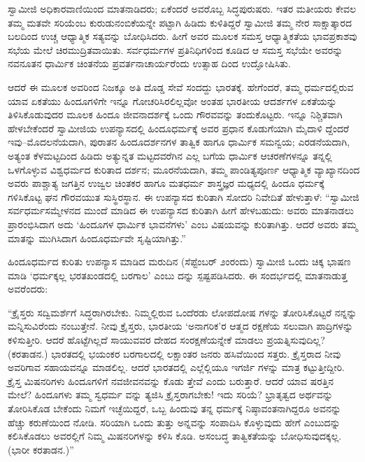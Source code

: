 ಸ್ವಾಮೀಜಿ ಅಧಿಕಾರವಾಣಿಯಿಂದ ಮಾತನಾಡಿದರು; ಏಕೆಂದರೆ ಅವರೊಬ್ಬ ಸಿದ್ಧಪುರುಷರು. ಇತರ ಮತೀಯರು ಕೇವಲ ತಮ್ಮ ಮತವೇ ಸರಿಯೆಂಬ ಕುರುಡುನಂಬಿಕೆಯನ್ನೇ ಪಟ್ಟಾಗಿ ಹಿಡಿದು ಕುಳಿತಿದ್ದರೆ ಸ್ವಾಮೀಜಿ ತಮ್ಮ ನೇರ ಸಾಕ್ಷಾತ್ಕಾರದ ಬಲದಿಂದ ಉಚ್ಚ ಆಧ್ಯಾತ್ಮಿಕ ಸತ್ಯವನ್ನು ಬೋಧಿಸಿದರು. ಹೀಗೆ ಅವರ ಮೂಲಕ ಸಮಸ್ತ ಆಧ್ಯಾತ್ಮಿಕತೆಯ ಭಾವಪ್ರಕಾಶವು ಸಭೆಯ ಮೇಲೆ ಚಿರಮುದ್ರಿತವಾಯಿತು. ಸರ್ವಧರ್ಮಗಳ ಪ್ರತಿನಿಧಿಗಳಿಂದ ಕೂಡಿದ ಆ ಸಮಸ್ತ ಸಭೆಯೇ ಅವರನ್ನು ನವನೂತನ ಧಾರ್ಮಿಕ ಚಿಂತನೆಯ ಪ್ರವರ್ತನಾಚಾರ್ಯರೆಂದು ಉತ್ಸಾಹ ದಿಂದ ಉದ್ಘೋಷಿಸಿತು.

ಆದರೆ ಈ ಮೂಲಕ ಅವರಿಂದ ನಿಜಕ್ಕೂ ಅತಿ ದೊಡ್ಡ ಸೇವೆ ಸಂದದ್ದು ಭಾರತಕ್ಕೆ. ಹೇಗೆಂದರೆ, ತಮ್ಮ ಧರ್ಮದಲ್ಲಿರುವ ಯಾವ ಏಕತೆಯು ಹಿಂದೂಗಳಿಗೇ ಇನ್ನೂ ಗೋಚರಿಸಿರಲಿಲ್ಲವೋ ಅಂತಹ ಭಾರತೀಯ ಆದರ್ಶಗಳ ಏಕತೆಯನ್ನು ತಿಳಿಸಿಕೊಡುವುದರ ಮೂಲಕ ಹಿಂದೂ ಜೀವನಾದರ್ಶಕ್ಕೆ ಒಂದು ಗೌರವವನ್ನು ತಂದುಕೊಟ್ಟರು. ಇನ್ನೂ ನಿಶ್ಚಿತವಾಗಿ ಹೇಳಬೇಕೆಂದರೆ ಸ್ವಾಮೀಜಿಯ ಉಪನ್ಯಾಸದಲ್ಲಿ ಹಿಂದೂಧರ್ಮಕ್ಕೆ ಅವರ ಪ್ರಧಾನ ಕೊಡುಗೆಯಾಗಿ ಮೈದಾಳಿ ದ್ದೆಂದರೆ ಇವು–ಮೊದಲನೆಯದಾಗಿ, ಪುರಾತನ ಹಿಂದೂದರ್ಶನಗಳ ತಾತ್ವಿಕ ಹಾಗೂ ಧಾರ್ಮಿಕ ಸಮನ್ವಯ; ಎರಡನೆಯದಾಗಿ, ಅತ್ಯಂತ ಕೆಳಮಟ್ಟದಿಂದ ಹಿಡಿದು ಅತ್ಯುನ್ನತ ಮಟ್ಟದವರೆಗಿನ ಎಲ್ಲ ಬಗೆಯ ಧಾರ್ಮಿಕ ಆಚರಣೆಗಳನ್ನೂ ತನ್ನಲ್ಲಿ ಒಳಗೊಳ್ಳುವ ವಿಶ್ವಧರ್ಮದ ಕುರಿತಾದ ದರ್ಶನ; ಮೂರನೆಯದಾಗಿ, ತಮ್ಮ ಪಾಂಡಿತ್ಯಪೂರ್ಣ ಆಧ್ಯಾತ್ಮಿಕ ವ್ಯಾಖ್ಯಾನದಿಂದ ಅವರು ಪಾಶ್ಚಾತ್ಯ ಜಗತ್ತಿನ ಉಜ್ವಲ ಚಿಂತಕರ ಹಾಗೂ ಮತಧರ್ಮ ಶಾಸ್ತ್ರಜ್ಞರ ಮಧ್ಯದಲ್ಲಿ ಹಿಂದೂ ಧರ್ಮಕ್ಕೆ ಗಳಿಸಿಕೊಟ್ಟ ಘನ ಗೌರವಯುತ ಸುಸ್ಥಿರಸ್ಥಾನ. ಈ ಉಪನ್ಯಾಸದ ಕುರಿತಾಗಿ ಸೋದರಿ ನಿವೇದಿತೆ ಹೇಳುತ್ತಾಳೆ: “ಸ್ವಾಮೀಜಿ ಸರ್ವಧರ್ಮಸಮ್ಮೇಳನದ ಮುಂದೆ ಮಾಡಿದ ಈ ಉಪನ್ಯಾಸದ ಕುರಿತಾಗಿ ಹೀಗೆ ಹೇಳಬಹುದು: ಅವರು ಮಾತನಾಡಲು ಪ್ರಾರಂಭಿಸಿದಾಗ ಅದು ‘ಹಿಂದೂಗಳ ಧಾರ್ಮಿಕ ಭಾವನೆಗಳು’ ಎಂಬ ವಿಷಯವನ್ನು ಕುರಿತಾಗಿತ್ತು. ಆದರೆ ಅವರು ತಮ್ಮ ಮಾತನ್ನು ಮುಗಿಸಿದಾಗ ಹಿಂದೂಧರ್ಮವೇ ಸೃಷ್ಟಿಯಾಗಿತ್ತು.”

ಹಿಂದೂಧರ್ಮದ ಕುರಿತು ಉಪನ್ಯಾಸ ಮಾಡಿದ ಮರುದಿನ (ಸೆಪ್ಟೆಂಬರ್ ೨ಂರಂದು) ಸ್ವಾಮೀಜಿ ಒಂದು ಚಿಕ್ಕ ಭಾಷಣ ಮಾಡಿ ‘ಧರ್ಮಕ್ಕಲ್ಲ ಭರತಖಂಡದಲ್ಲಿ ಬರಗಾಲ’ ಎಂಬು ದನ್ನು ಸ್ಪಷ್ಟಪಡಿಸಿದರು. ಈ ಸಂದರ್ಭದಲ್ಲಿ ಮಾತನಾಡುತ್ತ ಅವರೆಂದರು:

“ಕ್ರೈಸ್ತರು ಸದ್ವಿಮರ್ಶೆಗೆ ಸಿದ್ಧರಾಗಿರಬೇಕು. ನಿಮ್ಮಲ್ಲಿರುವ ಒಂದೆರಡು ಲೋಪದೋಷ ಗಳನ್ನು ತೋರಿಸಿಕೊಟ್ಟರೆ ನನ್ನನ್ನು ಮನ್ನಿಸುವಿರೆಂದು ನಂಬುತ್ತೇನೆ. ನೀವು ಕ್ರೈಸ್ತರು, ಭಾರತೀಯ ‘ಅನಾಗರಿಕ’ರ ಆತ್ಮದ ರಕ್ಷಣೆಯ ಸಲುವಾಗಿ ಪಾದ್ರಿಗಳನ್ನು ಕಳಿಸುತ್ತೀರಿ. ಆದರೆ ಹೊಟ್ಟೆಗಿಲ್ಲದೆ ಸಾಯುವವರ ದೇಹದ ಸಂರಕ್ಷಣೆಯನ್ನೇಕೆ ಮಾಡಲು ಪ್ರಯತ್ನಿಸುವುದಿಲ್ಲ? (ಕರತಾಡನ.) ಭಾರತದಲ್ಲಿ ಭಯಂಕರ ಬರಗಾಲದಲ್ಲಿ ಲಕ್ಷಾಂತರ ಜನರು ಹಸಿವೆಯಿಂದ ಸತ್ತರು. ಕ್ರೈಸ್ತರಾದ ನೀವು ಅವರಿಗಾವ ಸಹಾಯವನ್ನೂ ಮಾಡಲಿಲ್ಲ. ಆದರೆ ಭಾರತದಲ್ಲಿ ಎಲ್ಲೆಲ್ಲಿಯೂ ಇಗರ್ಜಿ ಗಳನ್ನು ಮಾತ್ರ ಕಟ್ಟುತ್ತೀದ್ದೀರಿ. ಕ್ರೈಸ್ತ ಮಿಷನರಿಗಳು ಹಿಂದೂಗಳಿಗೆ ನವಜೀವನವನ್ನು ಕೊಡು ತ್ತೇವೆ ಎಂದು ಬರುತ್ತಾರೆ. ಆದರೆ ಯಾವ ಷರತ್ತಿನ ಮೇಲೆ? ಹಿಂದೂಗಳು ತಮ್ಮ ಸ್ವಧರ್ಮ ವನ್ನು ತ್ಯಜಿಸಿ ಕ್ರೈಸ್ತರಾಗಬೇಕು! ಇದು ಸರಿಯೆ? ಭ್ರಾತೃತ್ವದ ಅರ್ಥವನ್ನು ತೋರಿಸಿಕೊಡ ಬೇಕೆಂದು ನಿಮಗೆ ಇಚ್ಛೆಯಿದ್ದರೆ, ಒಬ್ಬ ಹಿಂದುವು ತನ್ನ ಧರ್ಮಕ್ಕೆ ನಿಷ್ಠಾವಂತನಾಗಿದ್ದರೂ ಅವನನ್ನು ಹೆಚ್ಚು ಕರುಣೆಯಿಂದ ನೋಡಿ. ಸರಿಯಾಗಿ ಒಂದು ತುತ್ತು ಅನ್ನವನ್ನು ಸಂಪಾದಿಸಿ ಕೊಳ್ಳುವುದು ಹೇಗೆ ಎಂಬುದನ್ನು ಕಲಿಸಿಕೊಡಲು ಅವರಲ್ಲಿಗೆ ನಿಮ್ಮ ಮಿಷನರಿಗಳನ್ನು ಕಳಿಸಿ ಕೊಡಿ. ಅಸಂಬದ್ಧ ತಾತ್ವಿಕತೆಯನ್ನು ಬೋಧಿಸುವುದಕ್ಕಲ್ಲ. (ಭಾರೀ ಕರತಾಡನ.)”


